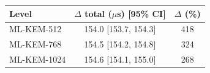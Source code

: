\begin{tabular}{|l|c|c|}
\hline
\textbf{Level} & \textbf{$\Delta$ total ($\mu$s) [95\% CI]} & \textbf{$\Delta$ (\%)} \\
\hline
ML-KEM-512 & 154.0 [153.7, 154.3] & 418 \\ \hline
ML-KEM-768 & 154.5 [154.2, 154.8] & 324 \\ \hline
ML-KEM-1024 & 154.6 [154.1, 155.0] & 268 \\ \hline
\end{tabular}

